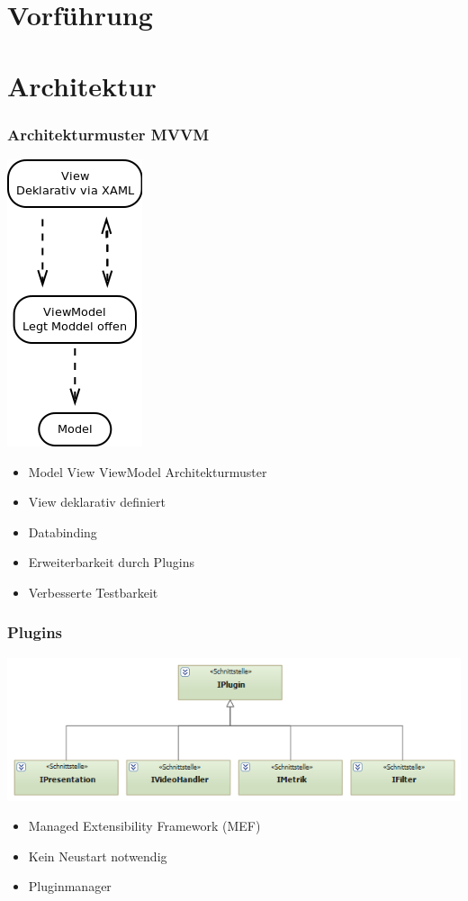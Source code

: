\documentclass[t]{beamer}
\begin{document}
\section{Vorführung}


\section{Architektur}
\begin{frame}
\frametitle{Architekturmuster  MVVM}
\begin{minipage}{5,5cm}
\begin{center}
\includegraphics[scale=.5]{img/arch/mvvm.png}
\end{center}
\end{minipage}
\begin{minipage}{5,5cm}
\begin{itemize}
\itemsep1em
\item <+-> Model View ViewModel Architekturmuster
\item <+-> View deklarativ definiert
\item <+-> Databinding
\item <+-> Erweiterbarkeit durch Plugins
\item <+-> Verbesserte Testbarkeit
\end{itemize}
\end{minipage}
\end{frame}
\begin{frame}
\frametitle{Plugins}
\begin{center}
\includegraphics[scale=.5]{img/arch/IPluginStructure.png}
\end{center}
\begin{itemize}
\itemsep1em
\item <+-> Managed Extensibility Framework (MEF)
\item <+-> Kein Neustart notwendig
 \item <+-> Pluginmanager
\end{itemize}
\end{frame}
\end{document}
